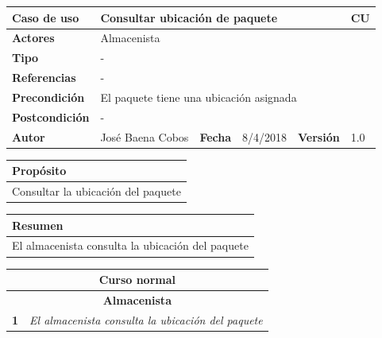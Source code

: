\documentclass[12pt,spanish]{article}
\begin{document}
\begin{table}[H]
	\centering
	\begin{tabular}{|m{3cm}|m{4cm}|m{2cm}|m{2cm}|m{2cm}|m{1cm}|}
		\hline
		\textbf{Caso de uso} &  \multicolumn{4}{m{11cm}|}{Consultar ubicación de paquete} \vline &  \cellcolor{gray!40}CU\arabic{contadorCU}  \stepcounter{contadorCU} \\
		\hline
		\textbf{Actores} & \multicolumn{5}{m{11cm}|}{Almacenista} \\
		\hline
		\textbf{Tipo} & \multicolumn{5}{m{11cm}|}{-} \\
		\hline
		\textbf{Referencias} &\multicolumn{5}{m{11cm}|}{-} \\
		\hline
		\textbf{Precondición} & \multicolumn{5}{m{11cm}|}{El paquete tiene una ubicación asignada} \\
		\hline
		\textbf{Postcondición} & \multicolumn{5}{m{11cm}|}{-} \\
		\hline
		\textbf{Autor} & José Baena Cobos & \textbf{Fecha} & 8/4/2018 & \textbf{Versión} & 1.0 \\
		\hline
	\end{tabular}
	
	\vspace{1cm}
	
	\begin{tabular}{|m{16.2cm}|}
		\hline
		\textbf{Propósito} \\
		\hline
		Consultar la ubicación del paquete \\
		\hline
	\end{tabular}
	
	\vspace{1cm}
	
	\begin{tabular}{|m{16.2cm}|}
		\hline
		\textbf{Resumen} \\
		\hline
		El almacenista consulta la ubicación del paquete\\
		\hline
	\end{tabular}
	
	\vspace{1cm}
	
	\begin{tabular}{|m{5pt}|m{15.5cm}|}
		\hline
		\multicolumn{2}{|c|}{\textbf{Curso normal}} \\
		\hline
		\multicolumn{2}{|c|}{\textbf{Almacenista}} \\
		\hline
		\textbf{1} & \textit{El almacenista consulta la ubicación del paquete}\\
		\hline
		

\end{tabular}
\end{table}
\end{document}
